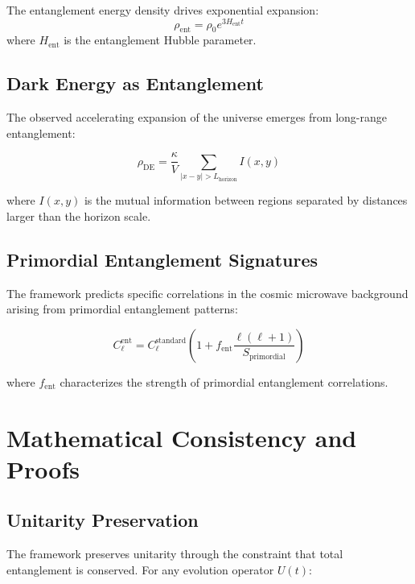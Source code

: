 \documentclass[twocolumn,showpacs,preprintnumbers,amsmath,amssymb,aps]{revtex4-1}
\begin{document}
The entanglement energy density drives exponential expansion:
\begin{equation}
\rho_{\text{ent}} = \rho_0 e^{3H_{\text{ent}}t}
\label{eq:entanglement_energy}
\end{equation}
where $H_{\text{ent}}$ is the entanglement Hubble parameter.

\subsection{Dark Energy as Entanglement}

The observed accelerating expansion of the universe emerges from long-range entanglement:

\begin{equation}
\rho_{\text{DE}} = \frac{\kappa}{V} \sum_{|x-y| > L_{\text{horizon}}} I(x,y)
\label{eq:dark_energy}
\end{equation}

where $I(x,y)$ is the mutual information between regions separated by distances larger than the horizon scale.

\subsection{Primordial Entanglement Signatures}

The framework predicts specific correlations in the cosmic microwave background arising from primordial entanglement patterns:

\begin{equation}
C_\ell^{\text{ent}} = C_\ell^{\text{standard}} \left(1 + f_{\text{ent}} \frac{\ell(\ell+1)}{S_{\text{primordial}}}\right)
\label{eq:cmb_signatures}
\end{equation}

where $f_{\text{ent}}$ characterizes the strength of primordial entanglement correlations.

\section{Mathematical Consistency and Proofs}

\subsection{Unitarity Preservation}

The framework preserves unitarity through the constraint that total entanglement is conserved. For any evolution operator $U(t)$:
\end{document}
